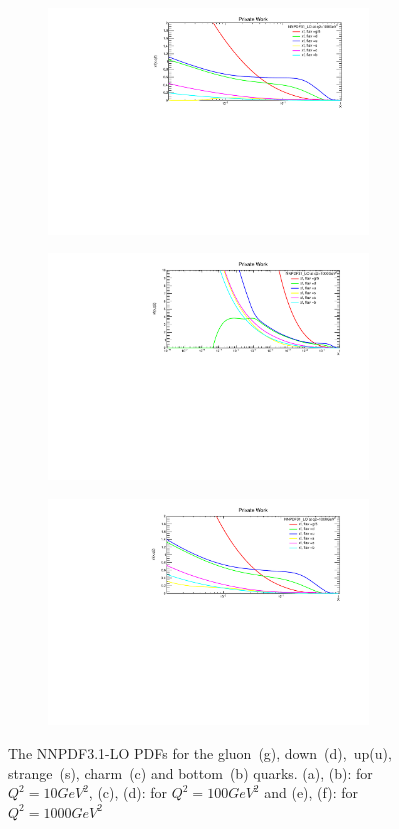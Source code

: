 \begin{figure}[H]
\begin{subfigure}{0.49\textwidth}
\vspace*{-8mm}
\caption{}
\end{subfigure}
\begin{subfigure}{0.49\textwidth}
\includegraphics[height=6cm, width=\textwidth]{chapter4/xfx100gev_lo1.pdf}
\vspace*{-8mm}
\caption{}
\end{subfigure}
\begin{subfigure}{0.49\textwidth}
\includegraphics[height=6cm, width=\textwidth]{chapter4/xfx1000gev_lo.pdf}
\vspace*{-8mm}
\caption{}
\end{subfigure}
\begin{subfigure}{0.49\textwidth}
\includegraphics[height=6cm, width=\textwidth]{chapter4/xfx1000gev_lo1.pdf}
\vspace*{-8mm}
\caption{}
\end{subfigure}
\caption{The NNPDF3.1-LO PDFs for the gluon~(g), down~(d),~up(u), strange~(s), charm~(c) and bottom~(b) quarks. (a), (b): for $Q^{2}= 10GeV^{2}$, (c), (d): for $Q^{2}=100GeV^{2}$ and (e), (f): for $Q^{2}=1000GeV^{2}$} 
\label{nnpdflo}
\end{figure}

